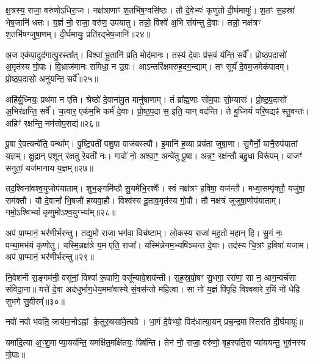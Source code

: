 क्ष॒त्रस्य॒ राजा॒ वरु॑णोऽधिरा॒जः। 
नक्ष॑त्राणाꣳ श॒तभि॑ष॒ग्वसि॑ष्ठः। 
तौ दे॒वेभ्यः॑ कृणुतो दी॒र्घमायुः॑। 
श॒तꣳ स॒हस्रा॑ भेष॒जानि॑ धत्तः। 
य॒ज्ञं नो॒ राजा॒ वरु॑ण॒ उप॑यातु। 
तन्नो॒ विश्वे॑ अ॒भि संय॑न्तु दे॒वाः। 
तन्नो॒ नक्ष॑त्रꣳ श॒तभि॑षग्जुषा॒णम्। 
दी॒र्घमायुः॒ प्रति॑रद्भेष॒जानि॑॥२४॥ 

अ॒ज एक॑पा॒दुद॑गात्पु॒रस्ता᳚त्। 
विश्वा॑ भू॒तानि॑ प्रति॒ मोद॑मानः। 
तस्य॑ दे॒वाः प्र॑स॒वं य॑न्ति॒ सर्वे᳚। 
प्रो॒ष्ठ॒प॒दासो॑ अ॒मृत॑स्य गो॒पाः। 
वि॒भ्राज॑मानः समिधा॒ न उ॒ग्रः। 
आऽन्तरि॑क्षमरुह॒दग॒न्द्याम्। 
तꣳ सूर्यं॑ दे॒वम॒जमेक॑पादम्। 
प्रो॒ष्ठ॒प॒दासो॒ अनु॑यन्ति॒ सर्वे᳚॥२५॥ 

अहि॑र्बु॒ध्नियः॒ प्रथ॑मा न एति। 
श्रेष्ठो॑ दे॒वाना॑मु॒त मानु॑षाणाम्। 
तं ब्रा᳚ह्म॒णाः सो॑म॒पाः सो॒म्यासः॑। 
प्रो॒ष्ठ॒प॒दासो॑ अ॒भिर॑क्षन्ति॒ सर्वे᳚। 
च॒त्वार॒ एक॑म॒भि कर्म॑ दे॒वाः। 
प्रो॒ष्ठ॒प॒दा स॒ इति॒ यान् वद॑न्ति। 
ते बु॒ध्नियं॑ परि॒षद्यꣴ॑ स्तु॒वन्तः॑। 
अहिꣳ॑ रक्षन्ति॒ नम॑सोप॒सद्य॑॥२६॥ 

पू॒षा रे॒वत्यन्वे॑ति॒ पन्था᳚म्। 
पु॒ष्टि॒पती॑ पशु॒पा वाज॑बस्त्यौ। 
इ॒मानि॑ ह॒व्या प्रय॑ता जुषा॒णा। 
सु॒गैर्नो॒ यानै॒रुप॑यातां य॒ज्ञम्। 
क्षु॒द्रान् प॒शून् र॑क्षतु रे॒वती॑ नः। 
गावो॑ नो॒ अश्वा॒ꣳ॒ अन्वे॑तु पू॒षा। 
अन्न॒ꣳ॒ रक्ष॑न्तौ बहु॒धा विरू॑पम्। 
वाजꣳ॑ सनुतां॒ यज॑मानाय य॒ज्ञम्॥२७॥ 

तद॒श्विना॑वश्व॒युजोप॑याताम्। 
शुभ॒ङ्गमि॑ष्ठौ सु॒यमे॑भि॒रश्वैः᳚। 
स्वं नक्ष॑त्रꣳ ह॒विषा॒ यज॑न्तौ। 
मध्वा॒सम्पृ॑क्तौ॒ यजु॑षा॒ सम॑क्तौ। 
यौ दे॒वानां᳚ भि॒षजौ॑ हव्यवा॒हौ। 
विश्व॑स्य दू॒ताव॒मृत॑स्य गो॒पौ। 
तौ नक्ष॑त्रं जुजुषा॒णोप॑याताम्। 
नमो॒ऽश्विभ्यां᳚ कृणुमोऽश्व॒युग्भ्या᳚म्॥२८॥ 

अप॑ पा॒प्मानं॒ भर॑णीर्भरन्तु। 
तद्य॒मो राजा॒ भग॑वा॒\an{} विच॑ष्टाम्। 
लो॒कस्य॒ राजा॑ मह॒तो म॒हान् हि। 
सु॒गं नः॒ पन्था॒मभ॑यं कृणोतु। 
यस्मि॒न्नक्ष॑त्रे य॒म एति॒ राजा᳚। 
यस्मि॑न्नेनम॒भ्यषि॑ञ्चन्त दे॒वाः। 
तद॑स्य चि॒त्रꣳ ह॒विषा॑ यजाम। 
अप॑ पा॒प्मानं॒ भर॑णीर्भरन्तु॥२९॥ 

नि॒वेश॑नी स॒ङ्गम॑नी॒ वसू॑नां॒ विश्वा॑ रू॒पाणि॒ वसू᳚न्यावे॒शय॑न्ती। 
स॒ह॒स्र॒पो॒षꣳ सु॒भगा॒ ररा॑णा॒ सा न॒ आग॒न्वर्च॑सा संविदा॒ना॥ यत्ते॑ दे॒वा अद॑धुर्भाग॒धेय॒ममा॑वास्ये सं॒वस॑न्तो महि॒त्वा। 
सा नो॑ य॒ज्ञं पि॑पृहि विश्ववारे र॒यिं नो॑ धेहि सुभगे सु॒वीरम्᳚॥३०॥ 

\closesection


नवो॑ नवो भवति॒ जाय॑मा॒नोऽह्नां के॒तुरु॒षसा॑मे॒त्यग्रे।
भा॒गं दे॒वेभ्यो॒ विद॑धात्या॒यन् प्रच॒न्द्रमास्तिरति दी॒र्घमायुः॑॥

यमा॑दि॒त्या अ॒ꣳ॒शु॒माप्या॒यय॑न्ति॒ यमक्षि॑त॒मक्षि॑तयः॒ पिब॑न्ति।
तेन॑ नो॒ राजा॒ वरु॑णो॒ बृह॒स्पति॒रा प्या॑ययन्तु॒ भुव॑नस्य गो॒पाः॥

